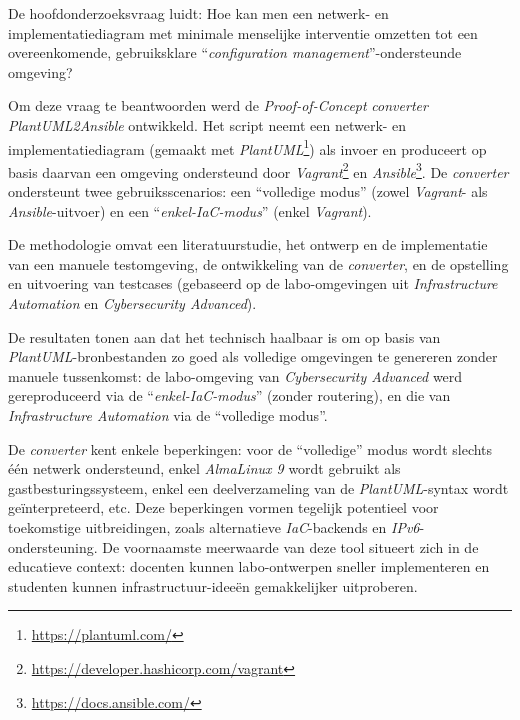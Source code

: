 De hoofdonderzoeksvraag luidt: Hoe kan men een netwerk- en implementatiediagram met minimale menselijke interventie omzetten tot een overeenkomende, gebruiksklare ``\emph{configuration management}''-ondersteunde omgeving?

Om deze vraag te beantwoorden werd de \emph{Proof-of-Concept} \emph{converter} \emph{PlantUML2Ansible} ontwikkeld. Het script neemt een netwerk- en implementatiediagram (gemaakt met \emph{PlantUML}\footnote{\url{https://plantuml.com/}}) als invoer en produceert op basis daarvan een omgeving ondersteund door \emph{Vagrant}\footnote{\url{https://developer.hashicorp.com/vagrant}} en \emph{Ansible}\footnote{\url{https://docs.ansible.com/}}. De \emph{converter} ondersteunt twee gebruiksscenarios: een ``volledige modus'' (zowel \emph{Vagrant}- als \emph{Ansible}-uitvoer) en een ``\emph{enkel-IaC-modus}'' (enkel \emph{Vagrant}).

De methodologie omvat een literatuurstudie, het ontwerp en de implementatie van een manuele testomgeving, de ontwikkeling van de \emph{converter}, en de opstelling en uitvoering van testcases (gebaseerd op de labo-omgevingen uit \emph{Infrastructure Automation} en \emph{Cybersecurity Advanced}).

De resultaten tonen aan dat het technisch haalbaar is om op basis van \emph{PlantUML}-bronbestanden zo goed als volledige omgevingen te genereren zonder manuele tussenkomst: de labo-omgeving van \emph{Cybersecurity Advanced} werd gereproduceerd via de ``\emph{enkel-IaC-modus}'' (zonder routering), en die van \emph{Infrastructure Automation} via de ``volledige modus''.

De \emph{converter} kent enkele beperkingen: voor de ``volledige'' modus wordt slechts één netwerk ondersteund, enkel \emph{AlmaLinux 9} wordt gebruikt als gastbesturingssysteem, enkel een deelverzameling van de \emph{PlantUML}-syntax wordt geïnterpreteerd, etc. Deze beperkingen vormen tegelijk potentieel voor toekomstige uitbreidingen, zoals alternatieve \emph{IaC}-backends en \emph{IPv6}-ondersteuning. De voornaamste meerwaarde van deze tool situeert zich in de educatieve context: docenten kunnen labo-ontwerpen sneller implementeren en studenten kunnen infrastructuur-ideeën gemakkelijker uitproberen.